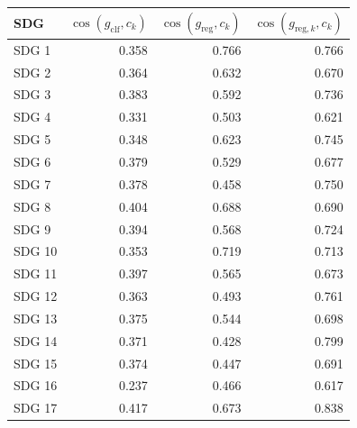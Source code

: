\begin{tabular}{lrrr}
\toprule
SDG & $\cos(g_{\mathrm{clf}}, c_k)$ & $\cos(g_{\mathrm{reg}}, c_k)$ & $\cos(g_{\mathrm{reg},k}, c_k)$ \\
\midrule
SDG 1 & 0.358 & 0.766 & 0.766 \\
SDG 2 & 0.364 & 0.632 & 0.670 \\
SDG 3 & 0.383 & 0.592 & 0.736 \\
SDG 4 & 0.331 & 0.503 & 0.621 \\
SDG 5 & 0.348 & 0.623 & 0.745 \\
SDG 6 & 0.379 & 0.529 & 0.677 \\
SDG 7 & 0.378 & 0.458 & 0.750 \\
SDG 8 & 0.404 & 0.688 & 0.690 \\
SDG 9 & 0.394 & 0.568 & 0.724 \\
SDG 10 & 0.353 & 0.719 & 0.713 \\
SDG 11 & 0.397 & 0.565 & 0.673 \\
SDG 12 & 0.363 & 0.493 & 0.761 \\
SDG 13 & 0.375 & 0.544 & 0.698 \\
SDG 14 & 0.371 & 0.428 & 0.799 \\
SDG 15 & 0.374 & 0.447 & 0.691 \\
SDG 16 & 0.237 & 0.466 & 0.617 \\
SDG 17 & 0.417 & 0.673 & 0.838 \\
\bottomrule
\end{tabular}
